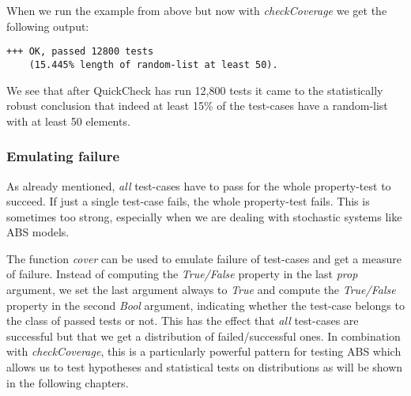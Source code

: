 When we run the example from above but now with \textit{checkCoverage} we get the following output:

\begin{verbatim}
+++ OK, passed 12800 tests 
    (15.445% length of random-list at least 50).
\end{verbatim}

We see that after QuickCheck has run 12,800 tests it came to the statistically robust conclusion that indeed at least 15\% of the test-cases have a random-list with at least 50 elements. 

\subsubsection*{Emulating failure}
As already mentioned, \textit{all} test-cases have to pass for the whole property-test to succeed. If just a single test-case fails, the whole property-test fails. This is sometimes too strong, especially when we are dealing with stochastic systems like ABS models.

The function \textit{cover} can be used to emulate failure of test-cases and get a measure of failure. Instead of computing the \textit{True/False} property in the last \textit{prop} argument, we set the last argument always to \textit{True} and compute the \textit{True/False} property in the second \textit{Bool} argument, indicating whether the test-case belongs to the class of passed tests or not. This has the effect that \textit{all} test-cases are successful but that we get a distribution of failed/successful ones. In combination with \textit{checkCoverage}, this is a particularly powerful pattern for testing ABS which allows us to test hypotheses and statistical tests on distributions as will be shown in the following chapters.